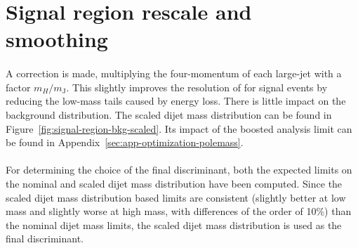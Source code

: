 \clearpage
\section{Signal region rescale and smoothing}
\label{sec:boosted-SR-smoothing}

\paragraph{}
A correction is made, multiplying the four-momentum of each large-\R jet with a factor $m_{H}/m_{\mathrm{J}}$. 
This slightly improves the resolution of \mtwoJ for signal events by reducing the low-mass tails caused by energy loss. 
There is little impact on the background distribution.
The scaled dijet mass distribution can be found in Figure~\ref{fig:signal-region-bkg-scaled}.
Its impact of the boosted analysis limit can be found in Appendix~\ref{sec:app-optimization-polemass}.

\paragraph{}
For determining the choice of the final discriminant, both the expected limits on the nominal and scaled dijet mass distribution have been computed.  
Since the scaled dijet mass distribution based limits are consistent (slightly better at low mass and slightly worse at high mass, with differences of the order of 10\%) than the nominal dijet mass limits, the scaled dijet mass distribution is used as the final discriminant.

